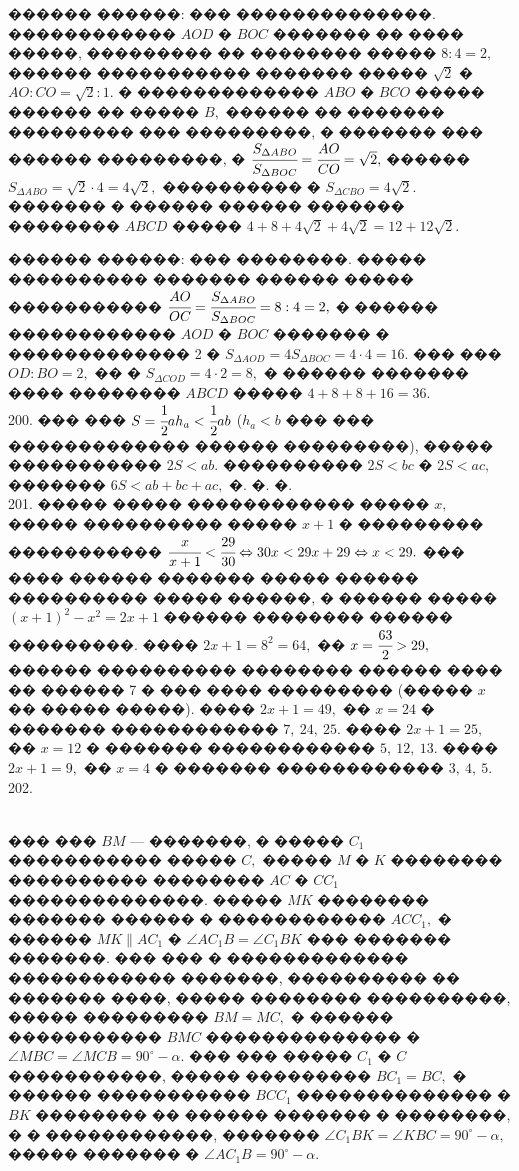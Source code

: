 \documentclass[12pt]{article}
\begin{document}
������ ������: ��� ��������������. ������������ $AOD$ � $BOC$ ������� �� ���� �����, ��������� �� �������� ����� $8:4=2,$ ������ ����������� ������� ����� $\sqrt{2}$ � $AO:CO=\sqrt{2}:1.$ � ������������� $ABO$ � $BCO$ ����� ������ �� ����� $B,$ ������ �� ������� ��������� ��� ���������, � ������� ��� ������ ���������, � $\cfrac{S_{\Delta ABO}}{S_{\Delta BOC}}=\cfrac{AO}{CO}=\sqrt{2},$ ������ $S_{\Delta ABO}=\sqrt{2}\cdot4=4\sqrt{2},$ ���������� � $S_{\Delta CBO}=4\sqrt{2}.$ ������� � ������ ������ ������� �������� $ABCD$ ����� $4+8+4\sqrt{2}+4\sqrt{2}=12+12\sqrt{2}.$

������ ������: ��� ��������. ����� ���������� ������� ������ ����� ����������� $\cfrac{AO}{OC}=\cfrac{S_{\Delta ABO}}{S_{\Delta BOC}}=8:4=2,$ � ������ ������������ $AOD$ � $BOC$ ������� � ������������� 2 � $S_{\Delta AOD}=4S_{\Delta BOC}=4\cdot4=16.$ ��� ��� $OD:BO=2,$ �� � $S_{\Delta COD}=4\cdot2=8,$ � ������ ������� ���� �������� $ABCD$ ����� $4+8+8+16=36.$\\
200. ��� ��� $S=\cfrac{1}{2}a h_a<\cfrac{1}{2}ab$ ($h_a<b$ ��� ��� ������������� ������ ���������), ����� ����������� $2S<ab.$ ���������� $2S<bc$ � $2S<ac,$ ������� $6S<ab+bc+ac,$ �. �. �.\\
201. ����� ����� ������������ ����� $x,$ ����� ���������� ����� $x+1$ � ��������� ����������� $\cfrac{x}{x+1}<\cfrac{29}{30}\Leftrightarrow 30x<29x+29
\Leftrightarrow x<29.$ ��� ���� ������ ������� ����� ������ ���������� ����� ������, � ������ ����� $(x+1)^2-x^2=2x+1$ ������ �������� ������ ���������.
���� $2x+1=8^2=64,$ �� $x=\cfrac{63}{2}>29,$ ������ ���������� �������� ������ ���� �� ������ 7 � ��� ���� ��������� (����� $x$ �� ����� �����). ���� $2x+1=49,$ �� $x=24$ � ������� ������������ $7,\ 24,\ 25.$ ���� $2x+1=25,$ �� $x=12$ � ������� ������������ $5,\ 12,\ 13.$ ���� $2x+1=9,$ �� $x=4$ � ������� ������������ $3,\ 4,\ 5.$\\
202. \begin{figure}[ht!]
\end{figure}\\
��� ��� $BM$ --- �������, � ����� $C_1$ ����������� ����� $C,$ ����� $M$ � $K$ �������� ���������� �������� $AC$ � $CC_1$ ��������������. ����� $MK$ �������� ������� ������ � ������������ $ACC_1,$ � ������ $MK\parallel AC_1$ � $\angle AC_1B=\angle C_1BK$ ��� ������� �������. ��� ��� � ������������� ������������ �������, ���������� �� ������� ����, ����� �������� ����������, ����� ��������� $BM=MC,$ � ������ ����������� $BMC$ �������������� � $\angle MBC=\angle MCB=90^\circ-\alpha.$ ��� ��� ����� $C_1$ � $C$ �����������, ����� ��������� $BC_1=BC,$ � ������ ����������� $BCC_1$ �������������� � $BK$ �������� �� ������ ������� � ��������, � � ������������, ������� $\angle C_1BK=\angle KBC=90^\circ-\alpha,$ ����� ������� � $\angle AC_1B=90^\circ-\alpha.$\\
\end{document}
